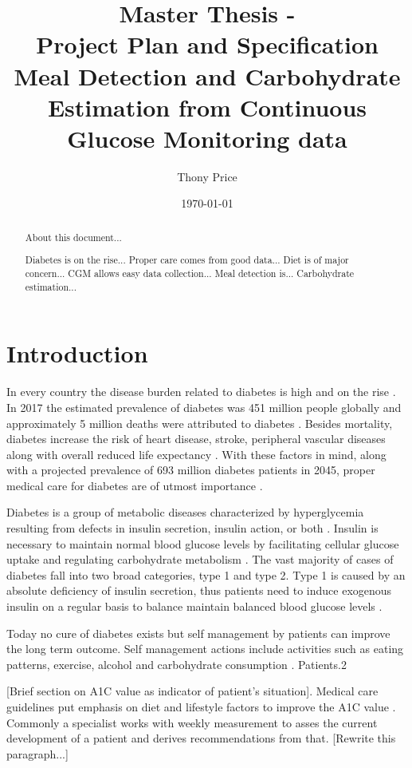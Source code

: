 \documentclass{kththesis}
\title{%
    Master Thesis - \\
    Project Plan and Specification \\
    \vspace{.5em}
    \large Meal Detection and Carbohydrate Estimation from Continuous Glucose Monitoring data \\
}
\author{Thony Price}
\date{\today}
\begin{document}
\frontmatter
\titlepage

\begin{abstract}
  About this document...

  Diabetes is on the rise...
  Proper care comes from good data...
  Diet is of major concern...
  CGM allows easy data collection...
  Meal detection is...
  Carbohydrate estimation...
\end{abstract}

\tableofcontents
\mainmatter

\chapter{Introduction}

In every country the disease burden related to diabetes is high and on the rise \parencite{Forouhi2014}.
In 2017 the estimated prevalence of diabetes was 451 million people globally and approximately 5 million deaths were attributed to diabetes \parencite{Cho2018}.
Besides mortality, diabetes increase the risk of heart disease, stroke, peripheral vascular diseases along with overall reduced life expectancy \parencite{Forouhi2014}.
With these factors in mind, along with a projected prevalence of 693 million diabetes patients in 2045, proper medical care for diabetes are of utmost importance \parencite{Cho2018}.

Diabetes is a group of metabolic diseases characterized by hyperglycemia resulting from defects in insulin secretion, insulin action, or both \parencite{ADA2010}.
Insulin is necessary to maintain normal blood glucose levels by facilitating cellular glucose uptake and regulating carbohydrate metabolism \parencite{Wilcox2005}.
The vast majority of cases of diabetes fall into two broad categories, type 1 and type 2.
Type 1 is caused by an absolute deficiency of insulin secretion, thus
patients need to induce exogenous insulin on a regular basis to balance maintain balanced blood glucose levels \parencite{ADA2010}.

Today no cure of diabetes exists but self management by patients can improve the long term outcome.
Self management actions include activities such as eating patterns, exercise, alcohol and carbohydrate consumption \parencite{S38}.
Patients.2

[Brief section on A1C value as indicator of patient's situation].
Medical care guidelines put emphasis on diet and lifestyle factors to improve the A1C value \parencite{ADA2018}.
Commonly a specialist works with weekly measurement to asses the current development of a patient and derives recommendations from that. [Rewrite this paragraph...]
\end{document}
